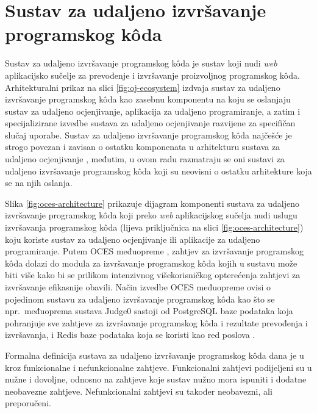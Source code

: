 \documentclass[times, utf8, diplomski]{fer}
\begin{document}
\pagebreak

\section{Sustav za udaljeno izvršavanje programskog kôda}
Sustav za udaljeno izvršavanje programskog kôda je sustav koji nudi \textit{web} aplikacijsko sučelje  za prevođenje i izvršavanje proizvoljnog programskog kôda. Arhitekturalni prikaz na slici \ref{fig:oj-ecosystem} izdvaja sustav za udaljeno izvršavanje programskog kôda kao zasebnu komponentu na koju se oslanjaju sustav za udaljeno ocjenjivanje, aplikacija za udaljeno programiranje, a zatim i specijalizirane izvedbe sustava za udaljeno ocjenjivanje razvijene za specifičan slučaj uporabe. Sustav za udaljeno izvršavanje programskog kôda najčešće je strogo povezan i zavisan o ostatku komponenata u arhitekturu sustava za udaljeno ocjenjivanje \citep{9245310}, međutim, u ovom radu razmatraju se oni sustavi za udaljeno izvršavanje programskog kôda koji su neovisni o ostatku arhitekture koja se na njih oslanja.

Slika \ref{fig:oces-architecture} prikazuje dijagram komponenti sustava za udaljeno izvršavanje programskog kôda koji preko \textit{web} aplikacijskog sučelja nudi uslugu izvršavanja programskog kôda (lijeva priključnica na slici \ref{fig:oces-architecture}) koju koriste sustav za udaljeno ocjenjivanje ili aplikacije za udaljeno programiranje. Putem OCES međuopreme , zahtjev za izvršavanje programskog kôda dolazi do modula za izvršavanje programskog kôda kojih u sustavu može biti više kako bi se prilikom intenzivnog višekorisničkog opterećenja zahtjevi za izvršavanje efikasnije obavili. Način izvedbe OCES međuopreme ovisi o pojedinom sustavu za udaljeno izvršavanje programskog kôda kao što se npr.\ međuoprema sustava Judge0 sastoji od PostgreSQL baze podataka koja pohranjuje sve zahtjeve za izvršavanje programskog kôda i rezultate prevođenja i izvršavanja, i Redis baze podataka koja se koristi kao red poslova  \citep{9245310}.

Formalna definicija sustava za udaljeno izvršavanje programskog kôda dana je u \citep{9245310} kroz funkcionalne i nefunkcionalne zahtjeve. Funkcionalni zahtjevi podijeljeni su u nužne i dovoljne, odnosno na zahtjeve koje sustav nužno mora ispuniti i dodatne neobavezne zahtjeve. Nefunkcionalni zahtjevi su također neobavezni, ali preporučeni.
\end{document}
